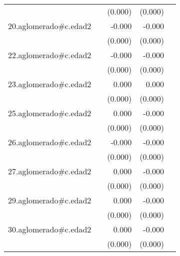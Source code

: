 {\begin{longtable}{l*{4}{D{.}{.}{-1}}}
            &                     &     (0.000)         &     (0.000)         &                     \\
\addlinespace
20.aglomerado#c.edad2&                     &      -0.000         &      -0.000         &                     \\
            &                     &     (0.000)         &     (0.000)         &                     \\
\addlinespace
22.aglomerado#c.edad2&                     &      -0.000         &      -0.000\sym{*}  &                     \\
            &                     &     (0.000)         &     (0.000)         &                     \\
\addlinespace
23.aglomerado#c.edad2&                     &       0.000         &       0.000         &                     \\
            &                     &     (0.000)         &     (0.000)         &                     \\
\addlinespace
25.aglomerado#c.edad2&                     &       0.000         &      -0.000         &                     \\
            &                     &     (0.000)         &     (0.000)         &                     \\
\addlinespace
26.aglomerado#c.edad2&                     &      -0.000         &      -0.000\sym{**} &                     \\
            &                     &     (0.000)         &     (0.000)         &                     \\
\addlinespace
27.aglomerado#c.edad2&                     &       0.000         &      -0.000         &                     \\
            &                     &     (0.000)         &     (0.000)         &                     \\
\addlinespace
29.aglomerado#c.edad2&                     &       0.000         &      -0.000         &                     \\
            &                     &     (0.000)         &     (0.000)         &                     \\
\addlinespace
30.aglomerado#c.edad2&                     &       0.000         &      -0.000         &                     \\
            &                     &     (0.000)         &     (0.000)         &                     \\

\end{longtable}}
